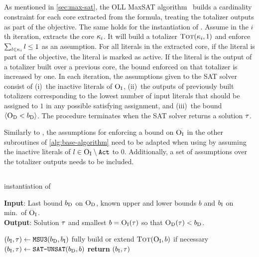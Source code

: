 \subsection{\oll{}\label{sec:oll}}

As mentioned in \cref{sec:max-sat}, the OLL MaxSAT algorithm~\autocite{DBLP:conf/cp/MorgadoDM14,DBLP:journals/jsat/IgnatievMM19} builds a cardinality constraint for each core extracted from the formula, treating the totalizer outputs as part of the objective.
The same holds for the \oll{} instantiation of \Min{}.
Assume in the $i$th iteration, \oll{} extracts the core $\kappa_i$.
It will build a totalizer $\textsc{Tot}(\kappa_i, 1)$ and enforce $\sum_{l\in\kappa_i} l \le 1$ as an assumption.
For all literals in the extracted core, if the literal is part of the objective, the literal is marked as active.
If the literal is the output of a totalizer built over a previous core, the bound enforced on that totalizer is increased by one.
In each iteration, the assumptions given to the SAT solver consist of (i)~the inactive literals of $\textsc{O}_{\text{I}}$, (ii)~the outputs of previously built totalizers corresponding to the lowest number of input literals that should be assigned to $1$ in any possible satisfying assignment, and (iii)~the bound $\langle \textsc{O}_{\text{D}} < b_{\text{D}} \rangle$.
The procedure terminates when the SAT solver returns a solution $\tau$.

Similarly to \msu{}, the assumptions for enforcing a bound on $\textsc{O}_{\text{I}}$ in the other subroutines of \cref{alg:base-algorithm} need to be adapted when using \oll{} by assuming the inactive literals of $l \in \textsc{O}_{\text{I}} \setminus \texttt{Act}$ to $0$.
Additionally, a set of assumptions over the totalizer outputs needs to be included.

\subsection{\msh{}\label{sec:hybrid}}

\begin{algorithm}[t]
  \caption{\msh{} instantiation of \Min{}}\label{alg:msh}
  \textbf{Input}: Last bound $b_{\text{D}}$ on $\textsc{O}_{\text{D}}$, known upper and lower bounds $b$ and $b_{\text{I}}$ on min.\ of $\textsc{O}_{\text{I}}$. \\
  \textbf{Output}: Solution $\tau$ and smallest $b=\textsc{O}_{\text{I}}(\tau)$ so that $\textsc{O}_{\text{D}}(\tau)<b_{\text{D}}$.

  \begin{algorithmic}[1]
    \IF{$|\Act| < \thr \cdot |\Obj_\inc|$}
      \STATE $(b_{\text{I}},\tau) \gets \texttt{MSU3}{}(b_{\text{D}}, b_{\text{I}})$ \label{ln:msh-msu}
    \ENDIF
    \IF{$|\Act| \ge \thr \cdot |\Obj_\inc|$}
      \STATE fully build or extend $\textsc{Tot}(\textsc{O}_{\text{I}}, b)$ if necessary \label{ln:msh-tot}
      \STATE $(b_{\text{I}},\tau) \gets \texttt{SAT-\allowbreak{}UNSAT}{}(b_{\text{D}}, b)$ \label{ln:msh-su}
    \ENDIF
    \STATE \textbf{return} $(b_{\text{I}},\tau)$ \label{ln:msh-ret}
  \end{algorithmic}
\end{algorithm}

